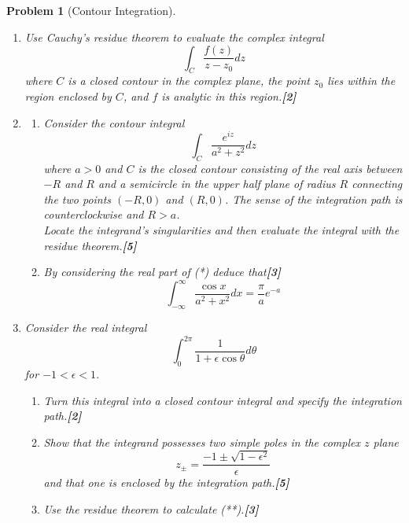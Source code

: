 \documentclass[a4paper]{article}
\theoremstyle{new}
\newtheorem{qns}{Problem}[section]
\begin{document}
\begin{qns}[Contour Integration]\leavevmode
\begin{enumerate}[label=(\roman*)]
\item Use Cauchy’s residue theorem to evaluate the complex integral
$$\int_C\frac{f(z)}{z-z_0}dz$$
where $C$ is a closed contour in the complex plane, the point $z_0$ lies within the region enclosed by $C$, and $f$ is analytic in this region.\hfill\textbf{[2]}\\[5pt]
\item
\begin{enumerate}[label=(\alph*)]
\item Consider the contour integral
\begin{equation}
    \int_C\frac{e^{iz}}{a^2+z^2}dz\tag{*}
\end{equation}
where $a > 0$ and $C$ is the closed contour consisting of the real axis between $−R$ and $R$ and a semicircle in the upper half plane of radius $R$ connecting the two points $(−R, 0)$ and $(R, 0)$. The sense of the integration path is counterclockwise and $R > a$.\\[5pt]
Locate the integrand’s singularities and then evaluate the integral with the residue theorem.\hfill\textbf{[5]}
\item By considering the real part of (*) deduce that\hfill\textbf{[3]}
$$\int_{-\infty}^\infty\frac{\cos x}{a^2+x^2}dx=\frac{\pi}{a}e^{-a}$$
\end{enumerate}
\item Consider the real integral 
\begin{equation}
  \int_0^{2\pi}\frac{1}{1+\epsilon\cos\theta}d\theta\tag{**}  
\end{equation}
for $−1 <\epsilon < 1$.
\begin{enumerate}[label=(\alph*)]
\item Turn this integral into a closed contour integral and specify the integration path.\hfill\textbf{[2]}
\item Show that the integrand possesses two simple poles in the complex $z$ plane
$$z_\pm=\frac{-1\pm\sqrt{1-\epsilon^2}}{\epsilon}$$
and that one is enclosed by the integration path.\hfill\textbf{[5]}
\item Use the residue theorem to calculate (**).\hfill\textbf{[3]}
\end{enumerate}
\end{enumerate}
\end{qns}
\end{document}

